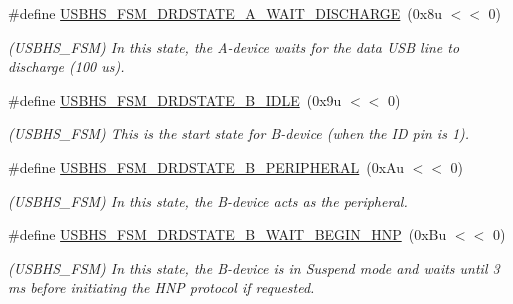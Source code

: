 \begin{DoxyCompactItemize}
\mbox{\label{group__SAMV71__USBHS_ga73a21bf18c64b8fc1f9140f2aee3a60d}} 
\#define \mbox{\hyperlink{group__SAMV71__USBHS_ga73a21bf18c64b8fc1f9140f2aee3a60d}{U\+S\+B\+H\+S\+\_\+\+F\+S\+M\+\_\+\+D\+R\+D\+S\+T\+A\+T\+E\+\_\+\+A\+\_\+\+W\+A\+I\+T\+\_\+\+D\+I\+S\+C\+H\+A\+R\+GE}}~(0x8u $<$$<$ 0)
\begin{DoxyCompactList}\small\item\em (U\+S\+B\+H\+S\+\_\+\+F\+SM) In this state, the A-\/device waits for the data U\+SB line to discharge (100 us). \end{DoxyCompactList}\item 
\mbox{\label{group__SAMV71__USBHS_ga52a65b3730682ddf864a9da2822bd24f}} 
\#define \mbox{\hyperlink{group__SAMV71__USBHS_ga52a65b3730682ddf864a9da2822bd24f}{U\+S\+B\+H\+S\+\_\+\+F\+S\+M\+\_\+\+D\+R\+D\+S\+T\+A\+T\+E\+\_\+\+B\+\_\+\+I\+D\+LE}}~(0x9u $<$$<$ 0)
\begin{DoxyCompactList}\small\item\em (U\+S\+B\+H\+S\+\_\+\+F\+SM) This is the start state for B-\/device (when the ID pin is 1). \end{DoxyCompactList}\item 
\mbox{\label{group__SAMV71__USBHS_gaec8e631d59ff509e8457448a5632685f}} 
\#define \mbox{\hyperlink{group__SAMV71__USBHS_gaec8e631d59ff509e8457448a5632685f}{U\+S\+B\+H\+S\+\_\+\+F\+S\+M\+\_\+\+D\+R\+D\+S\+T\+A\+T\+E\+\_\+\+B\+\_\+\+P\+E\+R\+I\+P\+H\+E\+R\+AL}}~(0x\+Au $<$$<$ 0)
\begin{DoxyCompactList}\small\item\em (U\+S\+B\+H\+S\+\_\+\+F\+SM) In this state, the B-\/device acts as the peripheral. \end{DoxyCompactList}\item 
\mbox{\label{group__SAMV71__USBHS_gaf360d605658449354fceceededb81156}} 
\#define \mbox{\hyperlink{group__SAMV71__USBHS_gaf360d605658449354fceceededb81156}{U\+S\+B\+H\+S\+\_\+\+F\+S\+M\+\_\+\+D\+R\+D\+S\+T\+A\+T\+E\+\_\+\+B\+\_\+\+W\+A\+I\+T\+\_\+\+B\+E\+G\+I\+N\+\_\+\+H\+NP}}~(0x\+Bu $<$$<$ 0)
\begin{DoxyCompactList}\small\item\em (U\+S\+B\+H\+S\+\_\+\+F\+SM) In this state, the B-\/device is in Suspend mode and waits until 3 ms before initiating the H\+NP protocol if requested. \end{DoxyCompactList}\item 

\end{DoxyCompactItemize}
